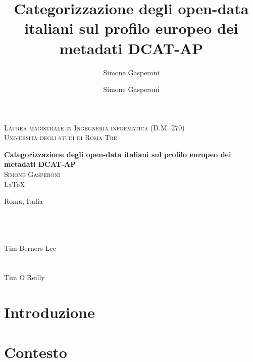\documentclass{article}
\author{Simone Gasperoni}
\author{Simone Gasperoni}
\title{Categorizzazione degli open-data italiani sul profilo europeo dei metadati DCAT-AP}
\theoremstyle{plain}
\theoremstyle{definition}
\begin{document}
\begin{titlepage}
\begin{center}

\textsc{Laurea magistrale in Ingegneria informatica (D.M. 270)}\\[0.5cm]
\textsc{Università degli studi di Roma Tre}\\[0.5cm]

\hrulefill

{ \huge \bfseries Categorizzazione degli open-data italiani sul profilo europeo dei metadati DCAT-AP \\[0.4cm] }
\textsc{\Large Simone Gasperoni}\\[0.5cm]
\vfill
\LaTeX


Roma, Italia
\end{center}
\end{titlepage}


\tableofcontents


\newpage

\vspace*{\fill}
\textit{
\\
\\
} 
\\
Tim Berners-Lee
\\
\\
\textit{
}
\\
Tim O'Reilly 
\vspace*{\fill}
\newpage

\newpage
\section{Introduzione}
\newpage
\section{Contesto}
\end{document}
